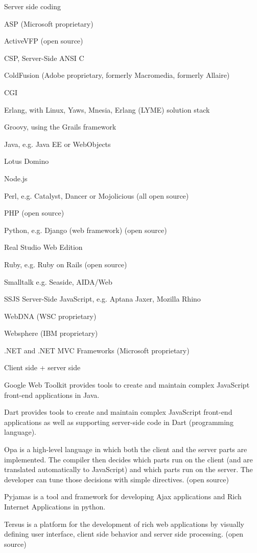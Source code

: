 \begin{compactitem}
\item Server side coding

\begin{compactitem}
\item ASP (Microsoft proprietary)
\item ActiveVFP (open source)
\item CSP, Server-Side ANSI C
\item ColdFusion (Adobe proprietary, formerly Macromedia, formerly Allaire)
\item CGI
\item Erlang, with Linux, Yaws, Mnesia, Erlang (LYME) solution stack
\item Groovy, using the Grails framework
\item Java, e.g. Java EE or WebObjects
\item Lotus Domino
\item Node.js
\item Perl, e.g. Catalyst, Dancer or Mojolicious (all open source)
\item PHP (open source)
\item Python, e.g. Django (web framework) (open source)
\item Real Studio Web Edition
\item Ruby, e.g. Ruby on Rails (open source)
\item Smalltalk e.g. Seaside, AIDA/Web
\item SSJS Server-Side JavaScript, e.g. Aptana Jaxer, Mozilla Rhino
\item WebDNA (WSC proprietary)
\item Websphere (IBM proprietary)
\item .NET and .NET MVC Frameworks (Microsoft proprietary)
\end{compactitem}


\item Client side + server side

\begin{compactitem}
\item Google Web Toolkit provides tools to create and maintain complex JavaScript front-end applications in Java.
\item Dart provides tools to create and maintain complex JavaScript front-end applications as well as supporting server-side code in Dart (programming language).
\item Opa is a high-level language in which both the client and the server parts are implemented. The compiler then decides which parts run on the client (and are translated automatically to JavaScript) and which parts run on the server. The developer can tune those decisions with simple directives. (open source)
\item Pyjamas is a tool and framework for developing Ajax applications and Rich Internet Applications in python.
\item Tersus is a platform for the development of rich web applications by visually defining user interface, client side behavior and server side processing. (open source)
\end{compactitem}


\end{compactitem}
